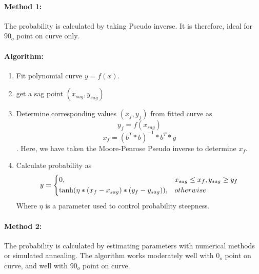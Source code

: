 \documentclass[20pt, a4paper]{report}
\begin{document}
			  \paragraph{Method 1:} The probability is calculated by taking Pseudo inverse. It is therefore, ideal for $90_{o}$ point on curve only.
			 \paragraph{Algorithm:}
			 \begin{enumerate}
			 \item Fit polynomial curve $y = f(x)$.
			 \item get a sag point $(x_{sag}, y_{sag})$
			 \item Determine corresponding values $(x_{f},y_{f})$ from fitted curve as $$ y_{f} = f(x_{sag})$$
			 $$x_{f} = (b^{T}*b)^{-1}*b^{T}*y$$.
			 Here, we have taken the Moore-Penrose Pseudo inverse to determine $x_{f}$.
			 \item Calculate probability as 
			 \begin{equation*}
			 	y = \begin{dcases}
			 	0,& x_{sag} \leq x_{f}, y_{sag} \geq y_{f}\\
			 	\tanh(\eta*(x_{f}-x_{sag})*(y_{f}-y_{sag})),&otherwise\\
			 	\end{dcases}
\end{equation*}		
		Where $\eta$ is a parameter used to control probability steepness.	  
			 \end{enumerate}
			   \paragraph{Method 2:} The probability is calculated by estimating parameters with numerical methods or simulated annealing. The algorithm works moderately well with $0_{o}$ point on curve, and well with $90_{o}$ point on curve. 
\end{document}
